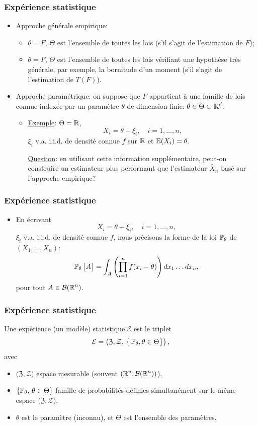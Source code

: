 \begin{frame}
\frametitle{Expérience statistique}
\begin{itemize}
\item Approche g\'en\'erale empirique:
\begin{itemize}
\item $\theta=F$, $\Theta$ est l'ensemble de
toutes les lois (s'il s'agit de l'estimation de $F$);
\item $\theta=F$, $\Theta$ est l'ensemble de
toutes les lois v\'erifiant une hypoth\`ese tr\`es g\'en\'erale, par
exemple, la bornitude d'un moment (s'il s'agit de l'estimation de
$T(F)$).
\end{itemize}
\item Approche param\'etrique: \alert{on suppose} que $F$ appartient \`a une
\alert{famille de lois connue} index\'ee par un param\`etre
$\theta$ de dimension finie: $\theta\in \Theta \subset \operatorname{{\mathbb R}}^d$.
\begin{itemize}
\item \underline{Exemple}: $\Theta = \operatorname{{\mathbb R}}$,
$$ X_i= \theta +\xi_i, \quad i=1,\dots,n,$$
$\xi_i$ v.a. i.i.d. de densit\'e \alert{connue} $f$ sur $\operatorname{{\mathbb R}}$
et $\operatorname{{\mathbb E}}(X_i)=\theta$.

\underline{Question}: en utilisant cette information
suppl\'ementaire, peut-on construire un estimateur plus performant
que l'estimateur $\bar X_n$ bas\'e sur l'approche empirique?
\end{itemize}
%
\end{itemize}
\end{frame}


\begin{frame}
\frametitle{Expérience statistique}
\begin{itemize}
\item En \'ecrivant
$$ X_i= \theta +\xi_i, \quad i=1,\dots,n,$$
$\xi_i$ v.a. i.i.d. de densit\'e \alert{connue} $f$, nous
pr\'ecisons la forme de la loi $\operatorname{{\mathbb P}}_{\theta}$ de
$(X_1,\dots,X_n)$:
$$\operatorname{{\mathbb P}}_\theta\big[A\big] = \int_A
\left(\prod_{i=1}^n f(x_i-\theta)\right) dx_1\ldots dx_n,
$$
pour tout $A\in {\mathcal B}(\operatorname{{\mathbb R}}^n)$.
\end{itemize}
\end{frame}


\begin{frame}
\frametitle{Expérience statistique}
\begin{df}
Une expérience (un modèle) statistique ${\mathcal E}$ est le triplet
$${\mathcal E} = \left(\mathfrak{Z}, {\mathcal Z}, \,\big\{\operatorname{{\mathbb P}}_\theta, \theta \in \Theta\big\}\right),$$
avec
\begin{itemize}
\item $\big(\mathfrak{Z}, {\mathcal Z}\big)$ espace mesurable (souvent
$(\operatorname{{\mathbb R}}^n,{\mathcal B}(\operatorname{{\mathbb R}}^n))$),
\item $\{\operatorname{{\mathbb P}}_\theta,\,\theta \in \Theta\}$ famille de probabilités définies \alert{simultanément} sur le même espace  $\big(\mathfrak{Z}, {\mathcal Z}\big)$,
\item $\theta$ est le \alert{paramètre (inconnu)}, et $\Theta$ est \alert{ l'ensemble des paramètres}.
\end{itemize}
\end{df}
\end{frame}


